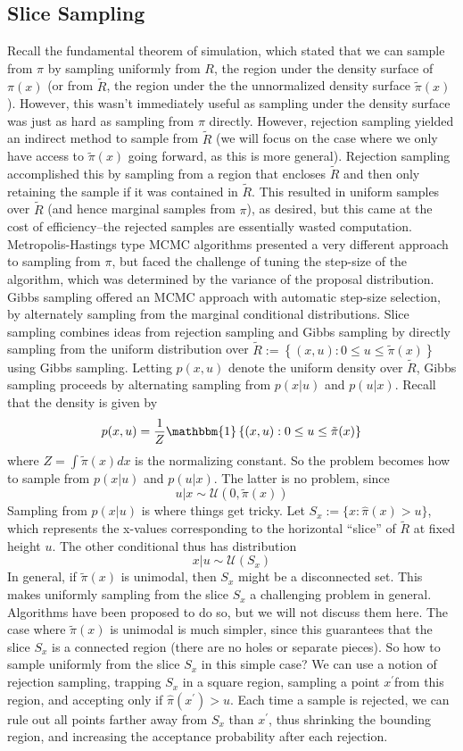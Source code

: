 \documentclass[12pt]{article}
\begin{document}
\subsection{Slice Sampling}
Recall the fundamental theorem of simulation, which stated that we can sample from $\pi$ by sampling uniformly from $R$, the region under the density surface of $\pi(x)$
 (or from $\tilde{R}$, the region under the the unnormalized density surface
$\tilde{\pi}(x)$). However, this wasn't immediately useful as sampling under the density surface was just as hard as sampling from $\pi$ directly. However, rejection sampling yielded an indirect method
to sample from $\tilde{R}$ (we will focus on the case where we only have access to $\tilde{\pi}(x)$ going forward, as this is more general). Rejection sampling accomplished this by sampling from a region 
that encloses $\tilde{R}$ and then only retaining the sample if it was contained in $\tilde{R}$. This resulted in uniform samples over $\tilde{R}$ (and hence marginal samples from $\pi$), as desired, but this came
at the cost of efficiency--the rejected samples are essentially wasted computation. Metropolis-Hastings type MCMC algorithms presented a very different approach to sampling from $\pi$, but faced the challenge of 
tuning the step-size of the algorithm, which was determined by the variance of the proposal distribution. Gibbs sampling offered an MCMC approach with automatic step-size selection, by alternately sampling from 
the marginal conditional distributions. Slice sampling combines ideas from rejection sampling and Gibbs sampling by directly sampling from the uniform distribution over $\tilde{R} := \left\{(x, u): 0 \leq u \leq \tilde{\pi}(x) \right\}$
using Gibbs sampling. Letting $p(x, u)$ denote the uniform density over $\tilde{R}$, Gibbs sampling proceeds by alternating sampling from $p(x|u)$ and $p(u|x)$. Recall that the density is given by 
\[p(x, u) = \frac{1}{Z}\mathbbm{1}\left\{(x, u): 0 \leq u \leq \tilde{\pi}(x) \right\}\]
where $Z = \int \tilde{\pi}(x) dx$ is the normalizing constant. So the problem becomes how to sample from $p(x|u)$ and $p(u|x)$. The latter is no problem, since
\[u|x \sim \mathcal{U}(0, \tilde{\pi}(x))\]
Sampling from $p(x|u)$ is where things get tricky. Let $S_x := \{x: \hat{\pi}(x) > u\}$, which represents the x-values corresponding to the horizontal ``slice'' of $\tilde{R}$ at fixed height $u$. The other conditional thus has 
distribution
\[x|u \sim \mathcal{U}(S_x)\]
In general, if $\tilde{\pi}(x)$ is unimodal, then $S_x$ might be a disconnected set. This makes uniformly sampling from the slice $S_x$ a challenging problem in general. Algorithms have been proposed to do so, but we will not 
discuss them here. The case where $\tilde{\pi}(x)$ is unimodal is much simpler, since this guarantees that the slice $S_x$ is a connected region (there are no holes or separate pieces). So how to sample uniformly 
from the slice $S_x$ in this simple case? We can use a notion of rejection sampling, trapping $S_x$ in a square region, sampling a point $x^\prime $from this region, and accepting only if $\hat{\pi}(x^\prime) > u$. Each time a sample is rejected, we can rule out all points farther away from $S_x$ than $x^\prime$, thus shrinking the bounding region, and increasing the acceptance probability after each rejection. 
\end{document}
